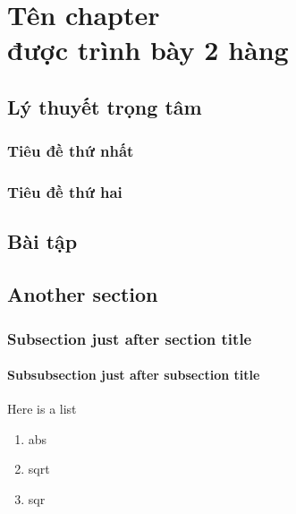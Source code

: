 \chapter[Tên chapter trong ToC]{Tên chapter\\ được trình bày 2 hàng}

\section{Lý thuyết trọng tâm}
	\lipsum[1]
\subsection{Tiêu đề thứ nhất}
	\lipsum[2-5]
	\luuy{\lipsum[4]}
\subsection{Tiêu đề thứ hai}
	\lipsum[6-8]
\section{Bài tập}

\section{Another section}
\subsection{Subsection just after section title}
\subsubsection{Subsubsection just after subsection title}
	Here is a list
	\begin{enumerate}
		\item abs
		\item sqrt
		\item sqr
	\end{enumerate}
\lipsum

		